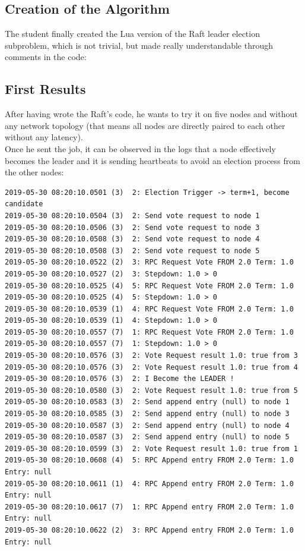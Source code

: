 \documentclass{eplmastersthesis}
\begin{document}
      \subsection{Creation of the Algorithm}

        The student finally created the Lua version of the Raft leader
        election subproblem, which is not trivial, but made really
        understandable through comments in the code:

        

      \subsection{First Results}

        After having wrote the Raft's code, he wants to try it on five nodes
        and without any network topology (that means all nodes are directly
        paired to each other without any latency).\\
        Once he sent the job, it can be observed in the logs that a node
        effectively becomes the leader and it is sending heartbeats to avoid
        an election process from the other nodes:

        \begin{lstlisting}[style=MyBash]
2019-05-30 08:20:10.0501 (3)  2: Election Trigger -> term+1, become candidate
2019-05-30 08:20:10.0504 (3)  2: Send vote request to node 1
2019-05-30 08:20:10.0506 (3)  2: Send vote request to node 3
2019-05-30 08:20:10.0508 (3)  2: Send vote request to node 4
2019-05-30 08:20:10.0508 (3)  2: Send vote request to node 5
2019-05-30 08:20:10.0522 (2)  3: RPC Request Vote FROM 2.0 Term: 1.0
2019-05-30 08:20:10.0527 (2)  3: Stepdown: 1.0 > 0
2019-05-30 08:20:10.0525 (4)  5: RPC Request Vote FROM 2.0 Term: 1.0
2019-05-30 08:20:10.0525 (4)  5: Stepdown: 1.0 > 0
2019-05-30 08:20:10.0539 (1)  4: RPC Request Vote FROM 2.0 Term: 1.0
2019-05-30 08:20:10.0539 (1)  4: Stepdown: 1.0 > 0
2019-05-30 08:20:10.0557 (7)  1: RPC Request Vote FROM 2.0 Term: 1.0
2019-05-30 08:20:10.0557 (7)  1: Stepdown: 1.0 > 0
2019-05-30 08:20:10.0576 (3)  2: Vote Request result 1.0: true from 3
2019-05-30 08:20:10.0576 (3)  2: Vote Request result 1.0: true from 4
2019-05-30 08:20:10.0576 (3)  2: I Become the LEADER !
2019-05-30 08:20:10.0580 (3)  2: Vote Request result 1.0: true from 5
2019-05-30 08:20:10.0583 (3)  2: Send append entry (null) to node 1
2019-05-30 08:20:10.0585 (3)  2: Send append entry (null) to node 3
2019-05-30 08:20:10.0587 (3)  2: Send append entry (null) to node 4
2019-05-30 08:20:10.0587 (3)  2: Send append entry (null) to node 5
2019-05-30 08:20:10.0599 (3)  2: Vote Request result 1.0: true from 1
2019-05-30 08:20:10.0608 (4)  5: RPC Append entry FROM 2.0 Term: 1.0 Entry: null
2019-05-30 08:20:10.0611 (1)  4: RPC Append entry FROM 2.0 Term: 1.0 Entry: null
2019-05-30 08:20:10.0617 (7)  1: RPC Append entry FROM 2.0 Term: 1.0 Entry: null
2019-05-30 08:20:10.0622 (2)  3: RPC Append entry FROM 2.0 Term: 1.0 Entry: null
        \end{lstlisting}
\end{document}
